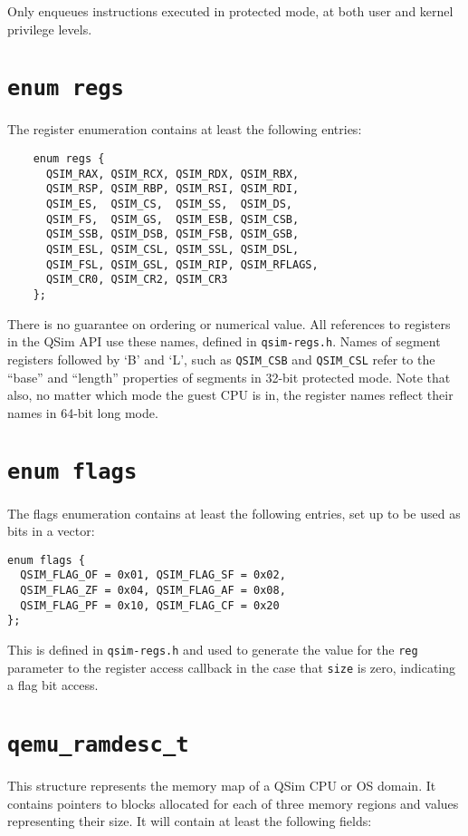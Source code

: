 \documentclass[letterpaper, 10pt]{book}
\begin{document}
Only enqueues instructions executed in protected mode, at both user and kernel
privilege levels.
\newpage

\section{\texttt{enum regs}} \label{enum:regs}
The register enumeration contains at least the following entries:

\begin{verbatim}
    enum regs {
      QSIM_RAX, QSIM_RCX, QSIM_RDX, QSIM_RBX,
      QSIM_RSP, QSIM_RBP, QSIM_RSI, QSIM_RDI,
      QSIM_ES,  QSIM_CS,  QSIM_SS,  QSIM_DS,
      QSIM_FS,  QSIM_GS,  QSIM_ESB, QSIM_CSB,
      QSIM_SSB, QSIM_DSB, QSIM_FSB, QSIM_GSB,
      QSIM_ESL, QSIM_CSL, QSIM_SSL, QSIM_DSL,
      QSIM_FSL, QSIM_GSL, QSIM_RIP, QSIM_RFLAGS,
      QSIM_CR0, QSIM_CR2, QSIM_CR3
    };
\end{verbatim}

There is no guarantee on ordering or numerical value. All references to
registers in the QSim API use these names, defined in \texttt{qsim-regs.h}.
Names of segment registers followed by `B' and `L', such as \texttt{QSIM\_CSB}
and \texttt{QSIM\_CSL} refer to the ``base'' and ``length'' properties of
segments in 32-bit protected mode. Note that also, no matter which mode the 
guest CPU is in, the register names reflect their names in 64-bit long mode.
\newpage

\section{\texttt{enum flags}} \label{enum:flags}
The flags enumeration contains at least the following entries, set up to be
used as bits in a vector:

\begin{verbatim}
enum flags {
  QSIM_FLAG_OF = 0x01, QSIM_FLAG_SF = 0x02,
  QSIM_FLAG_ZF = 0x04, QSIM_FLAG_AF = 0x08,
  QSIM_FLAG_PF = 0x10, QSIM_FLAG_CF = 0x20
};
\end{verbatim}

This is defined in \texttt{qsim-regs.h} and used to generate the value for the
\texttt{reg} parameter to the register access callback in the case that
\texttt{size} is zero, indicating a flag bit access.

\section{\texttt{qemu\_ramdesc\_t}} \label{struct:qemu_ramdesc_t}
This structure represents the memory map of a QSim CPU or OS domain. It
contains pointers to blocks allocated for each of three memory regions and
values representing their size. It will contain at least the following fields:
\end{document}
